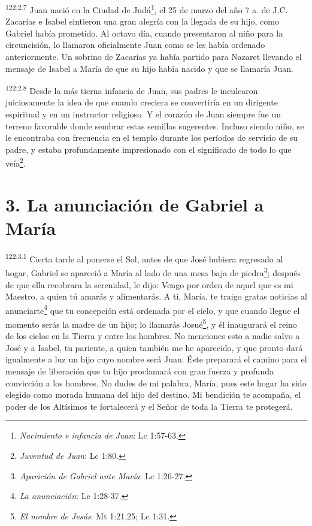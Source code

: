 \par 
\textsuperscript{122:2.7} Juan nació en la Ciudad de Judá\footnote{\textit{Nacimiento e infancia de Juan}: Lc 1:57-63.}, el 25 de marzo del año
7 a. de J.C. Zacarías e Isabel sintieron una gran alegría con la llegada de su hijo, como Gabriel había prometido. Al octavo día, cuando presentaron al niño para la circuncisión, lo llamaron oficialmente Juan como se les había ordenado anteriormente. Un sobrino de Zacarías ya había partido para Nazaret llevando el mensaje de Isabel a María de que su hijo había nacido y que se llamaría Juan.

\par 
\textsuperscript{122:2.8} Desde la más tierna infancia de Juan, sus padres le inculcaron juiciosamente la idea de que cuando creciera se convertiría en un dirigente espiritual y en un instructor religioso. Y el corazón de Juan siempre fue un terreno favorable donde sembrar estas semillas sugerentes. Incluso siendo niño, se le encontraba con frecuencia en el templo durante los períodos de servicio de su padre, y estaba profundamente impresionado con el significado de todo lo que veía\footnote{\textit{Juventud de Juan}: Lc 1:80.}.

\section*{3. La anunciación de Gabriel a María}
\par 
\textsuperscript{122:3.1} Cierta tarde al ponerse el Sol, antes de que José hubiera regresado al hogar, Gabriel se apareció a María al lado de una mesa baja de piedra\footnote{\textit{Aparición de Gabriel ante María}: Lc 1:26-27.}; después de que ella recobrara la serenidad, le dijo: \guillemotleft Vengo por orden de aquel que es mi Maestro, a quien tú amarás y alimentarás. A ti, María, te traigo gratas noticias al anunciarte\footnote{\textit{La anunciación}: Lc 1:28-37.} que tu concepción está ordenada por el cielo, y que cuando llegue el momento serás la madre de un hijo; lo llamarás Josué\footnote{\textit{El nombre de Jesús}: Mt 1:21,25; Lc 1:31.}, y él inaugurará el reino de los cielos en la Tierra y entre los hombres. No menciones esto a nadie salvo a José y a Isabel, tu pariente, a quien también me he aparecido, y que pronto dará igualmente a luz un hijo cuyo nombre será Juan. Éste preparará el camino para el mensaje de liberación que tu hijo proclamará con gran fuerza y profunda convicción a los hombres. No dudes de mi palabra, María, pues este hogar ha sido elegido como morada humana del hijo del destino. Mi bendición te acompaña, el poder de los Altísimos te fortalecerá y el Señor de toda la Tierra te protegerá\guillemotright.

